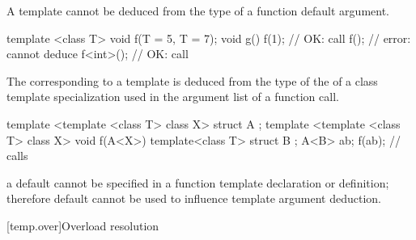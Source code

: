 \pnum
A template
cannot be deduced from the type of a function default argument.
\enterexample

\begin{codeblock}
template <class T> void f(T = 5, T = 7);
void g()
{
	f(1);			// OK: call 
	f();			// error: cannot deduce 
	f<int>();		// OK: call 
}
\end{codeblock}
\exitexampleb

\pnum
The
corresponding to a template
is deduced from the type of the
of a class template specialization used in the argument list of a function call.
\enterexample

\begin{codeblock}
template <template <class T> class X> struct A { };
template <template <class T> class X> void f(A<X>) { }
template<class T> struct B { };
A<B> ab;
f(ab);				// calls 
\end{codeblock}
\exitexampleb
\enternote a default  cannot be specified
in a function template declaration or definition; therefore default
 cannot be used to influence template
argument deduction.
\exitnote

[temp.over]{Overload resolution}

